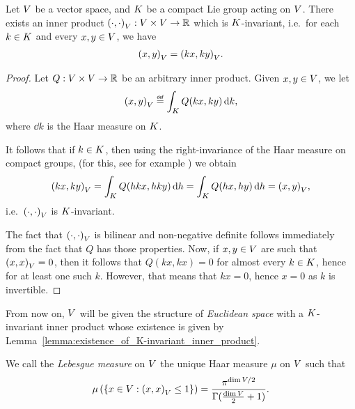 \begin{lemma}
\label{lemma:existence_of_K-invariant_inner_product}
    Let $V$ be a vector space,
    and $K$ be a compact Lie group acting on $V$.
    There exists an inner product ${\left(\cdot, \cdot\right)_{V}} : V \times V \to \mathbb{R}$ which is $K$-invariant,
    i.e.\ for each $k \in K$ and every $x, y \in V$, we have
    \begin{align*}
        {\left(x, y\right)_{V}} = {\left(k x, k y\right)_{V}}.
    \end{align*}
\end{lemma}
\begin{proof}
    Let $Q : V \times V \to \mathbb{R}$ be an arbitrary inner product.
    Given $x, y \in V$, we let
    \begin{align*}
        \ip{x}{y} \defeq \int_\CompactGroup Q(k x, k y) \dd k,
    \end{align*}
    where $\dd k$ is the Haar measure on $K$.

    It follows that if $k \in K$,
    then using the right-invariance of the Haar measure on compact groups,
    (for this, see for example \cite[Theorem 7.4.21]{RuzhanskyTurunen10})
    we obtain
    \begin{align*}
        {\left(k x, k y\right)_{V}}
        = \int_K Q(h k x, h k y) \,\mathrm{d} h
        = \int_K Q(h x, h y) \,\mathrm{d} h
        = {\left(x, y\right)_{V}},
    \end{align*}
    i.e.\ ${\left(\cdot, \cdot\right)_{V}}$ is $K$-invariant.

    The fact that ${\left(\cdot, \cdot\right)_{V}}$ is bilinear and non-negative definite follows immediately from the fact that $Q$ has those properties.
    Now, if $x, y \in V$ are such that ${\left(x, x\right)_{V}} = 0$,
    then it follows that $Q(k x, k x) = 0$ for almost every $k \in K$, hence for at least one such $k$.
    However, that means that $k x = 0$, hence $x = 0$ as $k$ is invertible.
\end{proof}

From now on, $V$ will be given the structure of \emph{Euclidean space} with a $K$-invariant inner product
whose existence is given by Lemma~\ref{lemma:existence_of_K-invariant_inner_product}.

\begin{definition}
    We call the \emph{Lebesgue measure} on $V$
    the unique Haar measure $\mu$ on $V$ such that
    \begin{align*}
        \mu\left(\{x \in V : {\left(x, x\right)_{V}} \leq 1\}\right) = \frac{\pi^{\dim V/2}}{\Gamma(\frac{\dim V}{2} + 1)}.
    \end{align*}
\end{definition}

